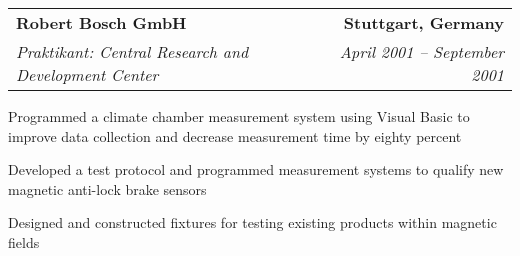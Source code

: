 
\begin{tabular*}{6.6in}{@{\extracolsep{\fill}}lr}
\textbf{Robert Bosch GmbH} & \textbf{Stuttgart, Germany}\\
\textit{Praktikant: Central Research and Development Center} & \textit{April 2001 -- September 2001}
\end{tabular*}
\begin{compactitem} 
\item Programmed a climate chamber measurement system using Visual Basic to improve data collection and decrease measurement time by eighty percent
\item Developed a test protocol and programmed measurement systems to qualify new magnetic anti-lock brake sensors
\item Designed and constructed fixtures for testing existing products within magnetic fields \medskip
\end{compactitem}